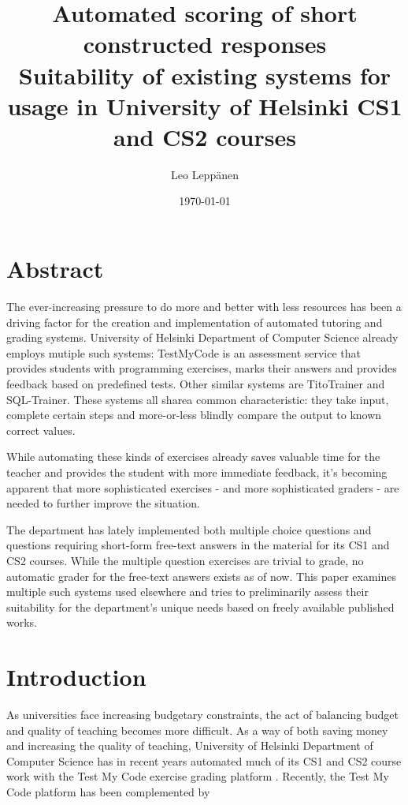 \documentclass[english]{tktltiki2}
\title{
	Automated scoring of short constructed responses \\
	\small{Suitability of existing systems for usage in University of Helsinki CS1 and CS2 courses}
}
\author{Leo Leppänen}
\date{\today}
\theoremstyle{definition}
\theoremstyle{remark}
\begin{document}

\frontmatter      %

\maketitle        %

\tableofcontents  %


\mainmatter       %

\section{Abstract}

The ever-increasing pressure to do more and better with less resources has been a driving factor for the creation and implementation of automated tutoring and grading systems. University of Helsinki Department of Computer Science already employs mutiple such systems: TestMyCode is an assessment service that provides students with programming exercises, marks their answers and provides feedback based on predefined tests. Other similar systems are TitoTrainer and SQL-Trainer. These systems all sharea  common characteristic: they take input, complete certain steps and more-or-less blindly compare the output to known correct values. 

While automating these kinds of exercises already saves valuable time for the teacher and provides the student with more immediate feedback, it's becoming apparent that more sophisticated exercises - and more sophisticated graders - are needed to further improve the situation.

The department has lately implemented both multiple choice questions and questions requiring short-form free-text answers in the material for its CS1 and CS2 courses. While the multiple question exercises are trivial to grade, no automatic grader for the free-text answers exists as of now. This paper examines multiple such systems used elsewhere and tries to preliminarily assess their suitability for the department's unique needs based on freely available published works.

\section{Introduction}

As universities face increasing budgetary constraints, the act of balancing budget and quality of teaching becomes more difficult. 
As a way of both saving money and increasing the quality of teaching, University of Helsinki Department of Computer Science has in recent years automated much of its CS1 and CS2 course work with the Test My Code exercise grading platform \cite{vihavainen13}.
Recently, the Test My Code platform has been complemented by 
\end{document}

